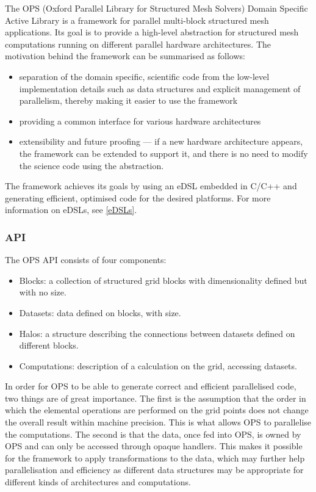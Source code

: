\documentclass[fontsize=11pt, appendixprefix=true]{scrreprt}
\begin{document}
The OPS (Oxford Parallel Library for Structured Mesh Solvers) Domain Specific
Active Library is a framework for parallel multi-block structured mesh
applications. Its goal is to provide a high-level abstraction for structured
mesh computations running on different parallel hardware architectures. The
motivation behind the framework can be summarised as follows:

\begin{itemize}
  \item separation of the domain specific, scientific code from the low-level
    implementation details such as data structures and explicit management of
    parallelism, thereby making it easier to use the framework
  \item providing a common interface for various hardware architectures
  \item extensibility and future proofing --- if a new hardware architecture
    appears, the framework can be extended to support it, and there is no need
    to modify the science code using the abstraction.
\end{itemize}

The framework achieves its goals by using an eDSL embedded in C/C++ and
generating efficient, optimised code for the desired platforms. For more
information on eDSLs, see \autoref{eDSLs}.

\subsubsection{API}

The OPS API consists of four components:

\begin{itemize}
  \item Blocks: a collection of structured grid blocks with dimensionality
    defined but with no size.
  \item Datasets: data defined on blocks, with size.
  \item Halos: a structure describing the connections between datasets defined
    on different blocks.
  \item Computations: description of a calculation on the grid, accessing
    datasets.
\end{itemize}

In order for OPS to be able to generate correct and efficient parallelised code,
two things are of great importance. The first is the assumption that the order
in which the elemental operations are performed on the grid points does not
change the overall result within machine precision. This is what allows OPS to
parallelise the computations. The second is that the data, once fed into OPS, is
owned by OPS and can only be accessed through opaque handlers. This makes it
possible for the framework to apply transformations to the data, which may
further help parallelisation and efficiency as different data structures may be
appropriate for different kinds of architectures and computations.
\end{document}
